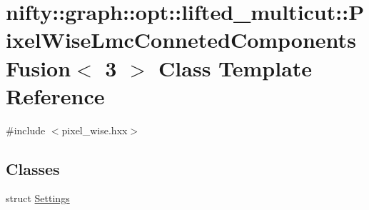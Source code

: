 \hypertarget{classnifty_1_1graph_1_1opt_1_1lifted__multicut_1_1PixelWiseLmcConnetedComponentsFusion_3_013_01_4}{}\section{nifty\+:\+:graph\+:\+:opt\+:\+:lifted\+\_\+multicut\+:\+:Pixel\+Wise\+Lmc\+Conneted\+Components\+Fusion$<$ 3 $>$ Class Template Reference}
\label{classnifty_1_1graph_1_1opt_1_1lifted__multicut_1_1PixelWiseLmcConnetedComponentsFusion_3_013_01_4}


{\ttfamily \#include $<$pixel\+\_\+wise.\+hxx$>$}

\subsection*{Classes}
\begin{DoxyCompactItemize}
\item 
struct \hyperlink{structnifty_1_1graph_1_1opt_1_1lifted__multicut_1_1PixelWiseLmcConnetedComponentsFusion_3_013_01_4_1_1Settings}{Settings}
\end{DoxyCompactItemize}
